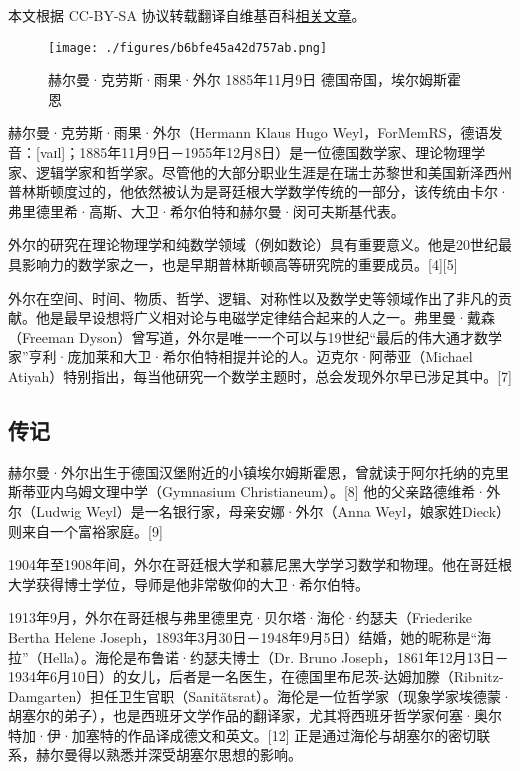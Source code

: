 
本文根据 CC-BY-SA 协议转载翻译自维基百科\href{https://en.wikipedia.org/wiki/Hermann_Weyl#Weyl_equation}{相关文章}。

\begin{figure}[ht]
\centering
\texttt{[image: ./figures/b6bfe45a42d757ab.png]}
\caption{赫尔曼·克劳斯·雨果·外尔  1885年11月9日  德国帝国，埃尔姆斯霍恩} \label{fig_WR_1}
\end{figure}
赫尔曼·克劳斯·雨果·外尔（Hermann Klaus Hugo Weyl，ForMemRS，德语发音：[vaɪl]；1885年11月9日－1955年12月8日）是一位德国数学家、理论物理学家、逻辑学家和哲学家。尽管他的大部分职业生涯是在瑞士苏黎世和美国新泽西州普林斯顿度过的，他依然被认为是哥廷根大学数学传统的一部分，该传统由卡尔·弗里德里希·高斯、大卫·希尔伯特和赫尔曼·闵可夫斯基代表。

外尔的研究在理论物理学和纯数学领域（例如数论）具有重要意义。他是20世纪最具影响力的数学家之一，也是早期普林斯顿高等研究院的重要成员。[4][5]

外尔在空间、时间、物质、哲学、逻辑、对称性以及数学史等领域作出了非凡的贡献。他是最早设想将广义相对论与电磁学定律结合起来的人之一。弗里曼·戴森（Freeman Dyson）曾写道，外尔是唯一一个可以与19世纪“最后的伟大通才数学家”亨利·庞加莱和大卫·希尔伯特相提并论的人。迈克尔·阿蒂亚（Michael Atiyah）特别指出，每当他研究一个数学主题时，总会发现外尔早已涉足其中。[7]

\subsection{传记}
赫尔曼·外尔出生于德国汉堡附近的小镇埃尔姆斯霍恩，曾就读于阿尔托纳的克里斯蒂亚内乌姆文理中学（Gymnasium Christianeum）。[8] 他的父亲路德维希·外尔（Ludwig Weyl）是一名银行家，母亲安娜·外尔（Anna Weyl，娘家姓Dieck）则来自一个富裕家庭。[9]

1904年至1908年间，外尔在哥廷根大学和慕尼黑大学学习数学和物理。他在哥廷根大学获得博士学位，导师是他非常敬仰的大卫·希尔伯特。

1913年9月，外尔在哥廷根与弗里德里克·贝尔塔·海伦·约瑟夫（Friederike Bertha Helene Joseph，1893年3月30日－1948年9月5日）结婚，她的昵称是“海拉”（Hella）。海伦是布鲁诺·约瑟夫博士（Dr. Bruno Joseph，1861年12月13日－1934年6月10日）的女儿，后者是一名医生，在德国里布尼茨-达姆加滕（Ribnitz-Damgarten）担任卫生官职（Sanitätsrat）。海伦是一位哲学家（现象学家埃德蒙·胡塞尔的弟子），也是西班牙文学作品的翻译家，尤其将西班牙哲学家何塞·奥尔特加·伊·加塞特的作品译成德文和英文。[12] 正是通过海伦与胡塞尔的密切联系，赫尔曼得以熟悉并深受胡塞尔思想的影响。

